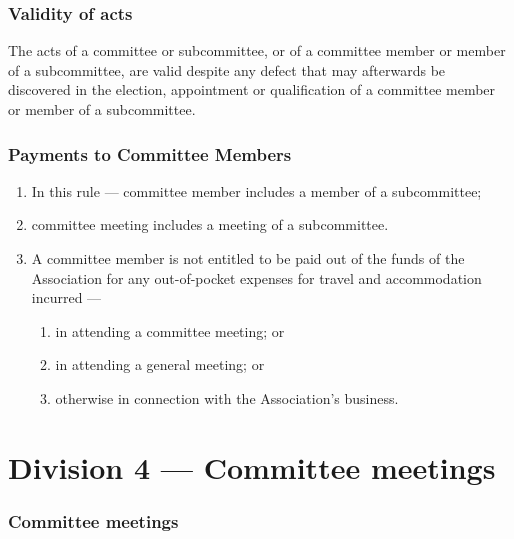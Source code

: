 \hypertarget{validity-of-acts}{%
\section{Validity of acts}\label{validity-of-acts}}

The acts of a committee or subcommittee, or of a committee member or member of a subcommittee, are valid despite any defect that may afterwards be discovered in the election, appointment or qualification of a committee member or member of a subcommittee.

\hypertarget{payments-to-committee-members}{%
\section{Payments to Committee Members}\label{payments-to-committee-members}}

\begin{enumerate}

\item In this rule --- committee member includes a member of a subcommittee;
\item committee meeting includes a meeting of a subcommittee.
\item A committee member is not entitled to be paid out of the funds of the Association for any out-of-pocket expenses for travel and accommodation incurred ---

  \begin{enumerate}
  
  \item in attending a committee meeting; or
  \item in attending a general meeting; or
  \item otherwise in connection with the Association's business.
  \end{enumerate}
\end{enumerate}

\hypertarget{division-4-committee-meetings}{%
\part*{Division 4 --- Committee meetings}\label{division-4-committee-meetings}}

\hypertarget{committee-meetings}{%
\section{Committee meetings}\label{committee-meetings}}

